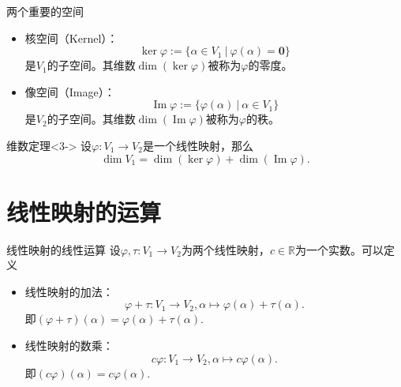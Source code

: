\begin{frame}

\begin{block}{两个重要的空间}
\begin{itemize}
\item<1-> 核空间（Kernel）：
$$\ker\varphi := \{\alpha \in V_1 \ |\ \varphi(\alpha) = \mathbf{0}\}$$
是$V_1$的子空间。其维数$\dim(\ker\varphi)$被称为$\varphi$的零度。
\item<2-> 像空间（Image）：
$$\operatorname{Im}\varphi := \{\varphi(\alpha) \ |\ \alpha \in V_1\}$$
是$V_2$的子空间。其维数$\dim(\operatorname{Im}\varphi)$被称为$\varphi$的秩。
\end{itemize}
\end{block}

\begin{block}{维数定理}<3->
设$\varphi: V_1 \to V_2$是一个线性映射，那么
$$\dim V_1 = \dim(\ker\varphi) + \dim(\operatorname{Im}\varphi).$$
\end{block}

\end{frame}


\section{线性映射的运算}


\begin{frame}

\begin{block}{线性映射的线性运算}
设$\varphi,\tau: V_1 \to V_2$为两个线性映射，$c\in\mathbb{R}$为一个实数。可以定义
\begin{itemize}
\item 线性映射的加法：
$$\varphi + \tau: V_1 \to V_2, \alpha \mapsto \varphi(\alpha) + \tau(\alpha).$$
即$(\varphi + \tau)(\alpha) = \varphi(\alpha) + \tau(\alpha)$.
\item 线性映射的数乘：
$$c\varphi: V_1 \to V_2, \alpha \mapsto c\varphi(\alpha) .$$
即$(c\varphi)(\alpha) = c\varphi(\alpha)$.
\end{itemize}
\end{block}

\end{frame}


